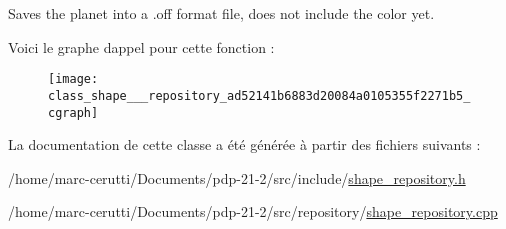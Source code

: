 Saves the planet into a .off format file, does not include the color yet. 

Voici le graphe d\textquotesingle{}appel pour cette fonction \+:
\nopagebreak
\begin{figure}[H]
\begin{center}
\leavevmode
\texttt{[image: class\_shape\_\_\_repository\_ad52141b6883d20084a0105355f2271b5\_cgraph]}
\end{center}
\end{figure}


La documentation de cette classe a été générée à partir des fichiers suivants \+:\begin{DoxyCompactItemize}
\item 
/home/marc-\/cerutti/\+Documents/pdp-\/21-\/2/src/include/\hyperlink{shape__repository_8h}{shape\+\_\+repository.\+h}\item 
/home/marc-\/cerutti/\+Documents/pdp-\/21-\/2/src/repository/\hyperlink{shape__repository_8cpp}{shape\+\_\+repository.\+cpp}\end{DoxyCompactItemize}
